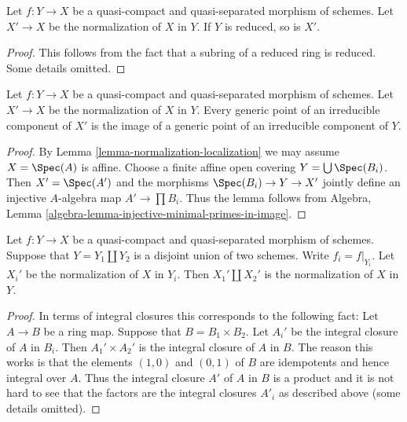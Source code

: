 \begin{lemma}
\label{lemma-normalization-in-reduced}
Let $f : Y \to X$ be a quasi-compact and quasi-separated morphism of schemes.
Let $X' \to X$ be the normalization of $X$ in $Y$. If $Y$ is reduced, so
is $X'$.
\end{lemma}

\begin{proof}
This follows from the fact that a subring of a reduced ring is reduced.
Some details omitted.
\end{proof}

\begin{lemma}
\label{lemma-normalization-generic}
Let $f : Y \to X$ be a quasi-compact and quasi-separated morphism of schemes.
Let $X' \to X$ be the normalization of $X$ in $Y$. Every generic point of
an irreducible component of $X'$ is the image of a generic point of
an irreducible component of $Y$.
\end{lemma}

\begin{proof}
By Lemma \ref{lemma-normalization-localization} we may assume $X = \Spec(A)$
is affine. Choose a finite affine open covering $Y = \bigcup \Spec(B_i)$.
Then $X' = \Spec(A')$ and the morphisms $\Spec(B_i) \to Y \to X'$
jointly define an injective $A$-algebra map $A' \to \prod B_i$.
Thus the lemma follows from
Algebra, Lemma \ref{algebra-lemma-injective-minimal-primes-in-image}.
\end{proof}

\begin{lemma}
\label{lemma-normalization-in-disjoint-union}
Let $f : Y \to X$ be a quasi-compact and quasi-separated morphism of schemes.
Suppose that $Y = Y_1 \amalg Y_2$ is a disjoint union of two schemes.
Write $f_i = f|_{Y_i}$. Let $X_i'$ be the normalization of $X$ in $Y_i$.
Then $X_1' \amalg X_2'$ is the normalization of $X$ in $Y$.
\end{lemma}

\begin{proof}
In terms of integral closures this corresponds to the following fact:
Let $A \to B$ be a ring map. Suppose that $B = B_1 \times B_2$.
Let $A_i'$ be the integral closure of $A$ in $B_i$. Then
$A_1' \times A_2'$ is the integral closure of $A$ in $B$.
The reason this works is that the elements $(1, 0)$ and $(0, 1)$ of $B$
are idempotents and hence integral over $A$. Thus the integral closure
$A'$ of $A$ in $B$ is a product and it is not hard to see that the factors
are the integral closures $A'_i$ as described above (some details
omitted).
\end{proof}


